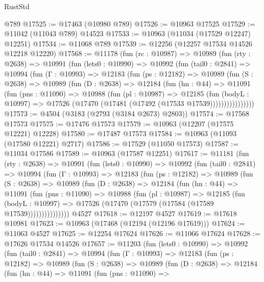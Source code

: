 \begin{lexlean}{RustStd}
\begin{coremodule}
    @789
@17525 := @17463 (@10980 @789)
@17526 := @10963 @17525
@17529 := @11042 (@11043 @789) @14523
@17533 := @10963 (@11034 (@17529 @12247) @12251)
@17534 := @11068 @789
@17539 := @12256 (@12257 @17534 @14526 @12218 @12220)
@17568 := @11178
    (fun (rc : @10987) =>
    @10989
      (fun (rty : @2638) =>
      @10991
        (fun (lets0 : @10990) =>
        @10992
          (fun (tail0 : @2841) =>
          @10994
            (fun (Γ : @10993) =>
            @12183
              (fun (ps : @12182) =>
              @10989
                (fun (S : @2638) =>
                @10989
                  (fun (D : @2638) =>
                  @12184
                    (fun (hn : @44) =>
                    @11091
                      (fun (pns : @11090) =>
                      @10988
                        (fun (pl : @10987) =>
                        @12185
                          (fun (bodyL : @10997) =>
                          @17526 (@17470 (@17481 (@17492 (@17533 @17539))))))))))))))))
@17573 := @4504 (@3183 (@2793 (@3184 @2673) @2803))
@17574 := @17568 @17573
@17575 := @17476 @17573
@17579 := @10963 (@12207 (@17575 @12221) @12228)
@17580 := @17487 @17573
@17584 := @10963 (@11093 (@17580 @12221) @2717)
@17586 := @17529 (@11050 @17573)
@17587 := @11034 @17586
@17589 := @10963 (@17587 @12251)
@17617 := @11181
    (fun (rty : @2638) =>
    @10991
      (fun (lets0 : @10990) =>
      @10992
        (fun (tail0 : @2841) =>
        @10994
          (fun (Γ : @10993) =>
          @12183
            (fun (ps : @12182) =>
            @10989
              (fun (S : @2638) =>
              @10989
                (fun (D : @2638) =>
                @12184
                  (fun (hn : @44) =>
                  @11091
                    (fun (pns : @11090) =>
                    @10988
                      (fun (pl : @10987) =>
                      @12185
                        (fun (bodyL : @10997) =>
                        @17526 (@17470 (@17579 (@17584 (@17589 @17539)))))))))))))))
    @4527
@17618 := @12197 @4527
@17619 := @17618 @10981
@17623 := @10963 (@17468 (@12194 (@12196 @17619)))
@17624 := @11063 @4527
@17625 := @12254 @17624
@17626 := @11066 @17624
@17628 := @17626 @17534 @14526
@17657 := @11203
    (fun (lets0 : @10990) =>
    @10992
      (fun (tail0 : @2841) =>
      @10994
        (fun (Γ : @10993) =>
        @12183
          (fun (ps : @12182) =>
          @10989
            (fun (S : @2638) =>
            @10989
              (fun (D : @2638) =>
              @12184
                (fun (hn : @44) =>
                @11091
                  (fun (pns : @11090) =>

\end{coremodule}
\end{lexlean}
